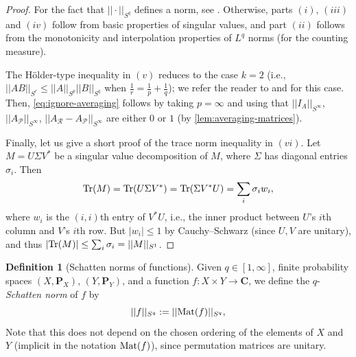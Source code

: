 \documentclass[reqno,11pt]{amsart}
\theoremstyle{definition}
\newtheorem{definition}[theorem]{Definition}
\theoremstyle{remark}
\numberwithin{equation}{section}
\newcommand{\C}{\mathbf{C}}
\renewcommand{\P}{\mathbf{P}}
\newcommand{\mR}{\mathcal{R}}
\newcommand{\mP}{\mathcal{P}}
\newcommand{\Tr}{\textnormal{Tr}}
\newcommand{\Mat}{\textnormal{Mat}}
\begin{document}
\begin{proof}
For the fact that $||\cdot ||_{S^q}$ defines a norm, see \cite{bhatia2000cartesian,zhan2002matrix}. Otherwise, parts $(i)$, $(iii)$ and $(iv)$ follow from basic properties of singular values, and part $(ii)$ follows from the monotonicity and interpolation properties of $L^q$ norms (for the counting measure). 

The H\"older-type inequality in $(v)$ reduces to the case $k = 2$ (i.e., $||AB||_{S^r} \le ||A||_{S^p} ||B||_{S^q}$ when $\frac{1}{r} = \frac{1}{p} + \frac{1}{q}$); we refer the reader to \cite[Corollary 4.27]{zhan2002matrix} and \cite[\S III]{ball2002sharp} for this case. Then, \cref{eq:ignore-averaging} follows by taking $p = \infty$ and using that $||I_A||_{S^\infty}$, $||A_\mP||_{S^\infty}$, $||A_\mR - A_\mP||_{S^\infty}$ are either $0$ or $1$ (by \cref{lem:averaging-matrices}). 

Finally, let us give a short proof of the trace norm inequality in $(vi)$. Let $M = U\Sigma V^*$ be a singular value decomposition of $M$, where $\Sigma$ has diagonal entries $\sigma_i$. Then
\[
    \Tr(M) = \Tr(U\Sigma V^*) = \Tr(\Sigma V^* U) 
    =
    \sum_i \sigma_i w_i,
\]
where $w_i$ is the $(i,i)$th entry of $V^*U$, i.e., the inner product between $U$'s $i$th column and $V$'s $i$th row. But $|w_i| \le 1$ by Cauchy--Schwarz (since $U, V$ are unitary), and thus $|\Tr(M)| \le \sum_i \sigma_i = ||M||_{S^1}$.
\end{proof}


\begin{definition}[Schatten norms of functions]
Given $q \in [1, \infty]$, finite probability spaces $(X, \P_X)$, $(Y, \P_Y)$, and a function $f : X \times Y \to \C$, we define the $q$-\emph{Schatten norm} of $f$ by
\[
    ||f||_{S^q} := ||\Mat(f)||_{S^q},
\]
Note that this does not depend on the chosen ordering of the elements of $X$ and $Y$ (implicit in the notation $\Mat(f)$), since permutation matrices are unitary.
\end{definition}
\end{document}
